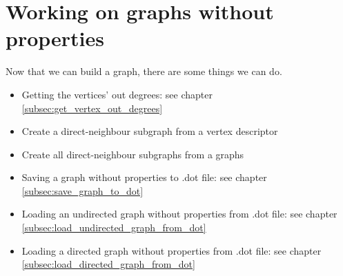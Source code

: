 \chapter{Working on graphs without properties}
\label{sec:Working-on-graphs-without-properties}

Now that we can build a graph, there are some things we can do.

\begin{itemize}
  \item
    Getting the vertices' out degrees: 
    see chapter \ref{subsec:get_vertex_out_degrees}
  \item
    Create a direct-neighbour subgraph from a vertex descriptor
  \item
    Create all direct-neighbour subgraphs from a graphs
  \item
    Saving a graph without properties to .dot file: 
    see chapter \ref{subsec:save_graph_to_dot}
  \item
    Loading an undirected graph without properties from .dot file: 
    see chapter \ref{subsec:load_undirected_graph_from_dot}
  \item
    Loading a directed graph without properties from .dot file: 
    see chapter \ref{subsec:load_directed_graph_from_dot}
\end{itemize}
